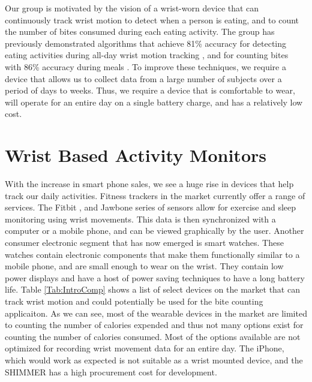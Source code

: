 Our group is motivated by the vision of a wrist-worn device that can continuously
track wrist motion to detect when a person is eating, and to count the number
of bites consumed during each eating activity.  The group has previously demonstrated
algorithms that achieve 81\% accuracy for detecting eating activities during all-day
wrist motion tracking \cite{dong2013detecting}, and for counting bites with 86\% accuracy during meals \cite{dong2012new}.
To improve these techniques, we require a device that allows us to collect data from
a large number of subjects over a period of days to weeks. Thus, we require a device that is
comfortable to wear, will operate for an entire day on a single battery charge, and
has a relatively low cost.
 
\section{Wrist Based Activity Monitors}
\label{Sec:FitnessTracking}
With the increase in smart phone sales,
we see a huge rise in devices that help track our daily activities.
Fitness trackers in the market currently offer a range of services. The Fitbit \cite{Web:FitBitOfficial},\cite{Web:FitbitFlex} and Jawbone \cite{Web:JawBoneWebsite} series of sensors allow for exercise and sleep monitoring using wrist movements. This data is then synchronized with a computer or a mobile phone, and can be viewed graphically by the user. Another consumer electronic segment that has now emerged is smart watches. These watches contain electronic components that make them functionally similar to a mobile phone, and are small enough to wear on the wrist. They contain low power displays and have a host of power saving techniques to have a long battery life. Table \ref{Tab:IntroComp} shows a list of select devices on the market that can track wrist motion and could potentially be used for the bite counting applicaiton.
As we can see, most of the wearable devices in the market are limited to counting the number of calories expended and thus not many options exist for counting the number of calories consumed. Most of the options available are not optimized for recording wrist movement data for an entire day.
The iPhone, which would work as expected is not suitable as a wrist mounted device, and the SHIMMER has a high procurement cost for development.
